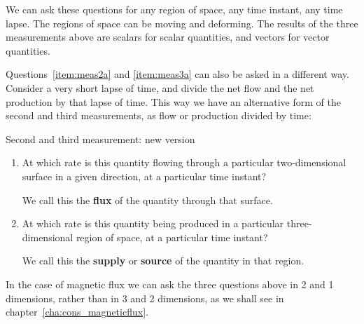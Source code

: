 \documentclass[a4paper,12pt,%
onecolumn,oneside,%
british%
]{memoir}
\renewcommand*{\|}[1][]{\nonscript\:#1\vert\nonscript\:\mathopen{}}
\newcommand*{\chap}{chapter}%
\begin{document}
We can ask these questions for any region of space, any time instant, any time lapse. The regions of space can be moving and deforming. The results of the three measurements above are scalars for scalar quantities, and vectors for vector quantities.

Questions~\ref{item:meas2a} and \ref{item:meas3a} can also be asked in a different way. Consider a very short lapse of time, and divide the net flow and the net production by that lapse of time. This way we have an alternative form of the second and third measurements, as flow or production divided by time:
\begin{definition}{Second and third measurement: new version}\label{def:fluxsupply}
  \begin{enumerate}[label={M\arabic*b}.,start=2,leftmargin=3em]

  \item At which rate is this quantity flowing through a particular two-dimensional surface in a given direction, at a particular time instant?

    We call this the \textbf{flux} of the quantity through that surface.

  \item At which rate is this quantity being produced in a particular three-dimensional region of space, at a particular time instant?

    We call this the \textbf{supply} or \textbf{source} of the quantity in that region.
  \end{enumerate}
\end{definition}

In the case of magnetic flux we can ask the three questions above in 2 and 1 dimensions, rather than in 3 and 2 dimensions, as we shall see in \chap~\ref{cha:cons_magneticflux}.

\end{document}
